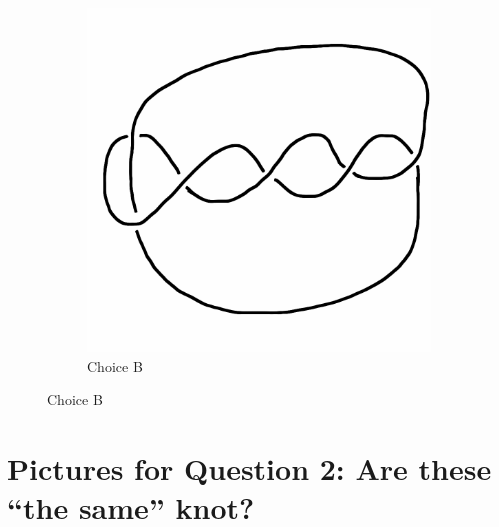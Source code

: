 \documentclass[12pt,letterpaper]{article}
\theoremstyle{definition}
\begin{document}
\begin{figure}[h!]
\begin{subfigure}[b]{0.4\textwidth}
        \includegraphics[width=\textwidth]{knotpics/9SeptQ1b.png}
        \caption{Choice B}
    \end{subfigure}
\end{figure}

\section*{Pictures for Question 2: Are these ``the same'' knot?}
\end{document}
